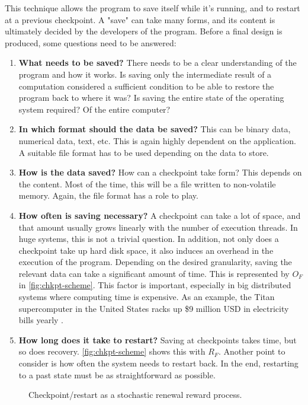 {This technique allows the program to save itself while it's running, and to restart at a previous checkpoint. A "save" can take many forms, and its content is ultimately decided by the developers of the program. Before a final design is produced, some questions need to be answered:
\begin{enumerate}
	\item \textbf{What needs to be saved?} There needs to be a clear understanding of the program and how it works. Is saving only the intermediate result of a computation considered a sufficient condition to be able to restore the program back to where it was? Is saving the entire state of the operating system required? Of the entire computer? 
	\item \textbf{In which format should the data be saved?} This can be binary data, numerical data, text, etc. This is again highly dependent on the application. A suitable file format has to be used depending on the data to store.
	\item \textbf{How is the data saved?} How can a checkpoint take form? This depends on the content. Most of the time, this will be a file written to non-volatile memory. Again, the file format has a role to play.
	\item \textbf{How often is saving necessary?} A checkpoint can take a lot of space, and that amount usually grows linearly with the number of execution threads. In huge systems, this is not a trivial question. In addition, not only does a checkpoint take up hard disk space, it also induces an overhead in the execution of the program. Depending on the desired granularity, saving the relevant data can take a significant amount of time. This is represented by $O_F$ in \autoref{fig:chkpt-scheme}. This factor is important, especially in big distributed systems where computing time is expensive. As an example, the Titan supercomputer in the United States racks up \$9 million USD in electricity bills yearly \cite{online:henn}.
	\item \textbf{How long does it take to restart?} Saving at checkpoints takes time, but so does recovery. \autoref{fig:chkpt-scheme} shows this with $R_F$. Another point to consider is how often the system needs to restart back. In the end, restarting to a past state must be as straightforward as possible.
\end{enumerate}
\begin{figure}[H]
	\centering
	
	\caption{Checkpoint/restart as a stochastic renewal reward process.}
	\label{fig:chkpt-scheme}
\end{figure}

}
